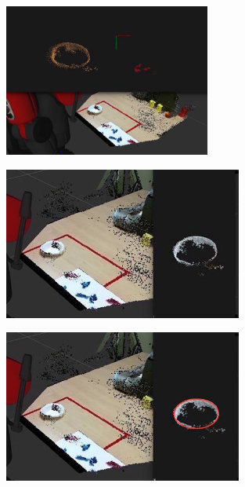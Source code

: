 \begin{figure}[H]
    \centering
    \begin{subfigure}[b]{0.475\textwidth}
        \centering
        \caption{}
        \label{fig:objectcluster}
        \includegraphics[width=\textwidth, height=5cm]{regiongrowing.jpg}
    \end{subfigure}
    \hfill
    \begin{subfigure}[b]{0.475\textwidth}  
        \centering 
        \caption{}
        \label{fig:whitebowl}
        \includegraphics[width=\textwidth, height=5cm]{whitecloud.jpg}
    \end{subfigure}
    \begin{subfigure}[b]{0.475\textwidth}   
        \centering 
        \caption{}
        \label{fig:bowlcircle}
        \includegraphics[width=\textwidth, height=5cm]{circlecloud.png}
    \end{subfigure}
    \quad
    \begin{subfigure}[b]{0.475\textwidth}   
        \centering 
        \caption{}
        \label{fig:rvizbowl}

\end{subfigure}
\end{figure}
